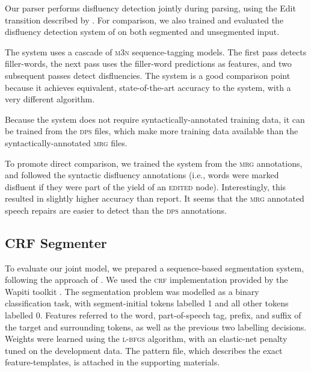 \documentclass[11pt,letterpaper]{article}
\begin{document}
Our parser performs disfluency detection jointly during parsing, using the Edit
transition described by \citet{honnibal:14}.  For comparison, we also trained
and evaluated the disfluency detection system of \citet{qian:13} on both
segmented and unsegmented input.

The \citet{qian:13} system uses a cascade of \textsc{m3n} sequence-tagging
models.  The first pass detects filler-words, the next pass uses the filler-word
predictions as features, and two subsequent passes detect disfluencies.
The system is a good comparison point because it achieves
equivalent, state-of-the-art accuracy to the \citet{honnibal:14} system,
with a very different algorithm.

Because the system does not require syntactically-annotated training data, it
can be trained from the \textsc{dps} files, which make more training data
available than the syntactically-annotated \textsc{mrg} files.  

To promote direct comparison, we trained the system from the \textsc{mrg}
annotations, and followed the syntactic disfluency annotations (i.e., words
were marked disfluent if they were part of the yield of an \textsc{edited} node).
Interestingly, this resulted in slightly higher accuracy than 
\citet{qian:13} report.  It seems that the \textsc{mrg} annotated speech repairs
are easier to detect than the \textsc{dps} annotations.

\subsection{CRF Segmenter}
\label{sec:crf}

To evaluate our joint model, we prepared a sequence-based segmentation system,
following the approach of \citet{liu:05}.  We used the \textsc{crf} implementation
provided by the Wapiti toolkit \citep{wapiti}.
The segmentation problem was modelled as a binary classification task, with
segment-initial
tokens labelled 1 and all other tokens labelled 0.
Features referred to the word, part-of-speech tag, prefix, and suffix of the
target and surrounding tokens, as well as the previous two labelling decisions.
Weights were learned using the \textsc{l-bfgs} algorithm,
with an elastic-net penalty tuned on the development data.  The pattern file,
which describes the exact feature-templates, is attached in the supporting
materials.
\end{document}

